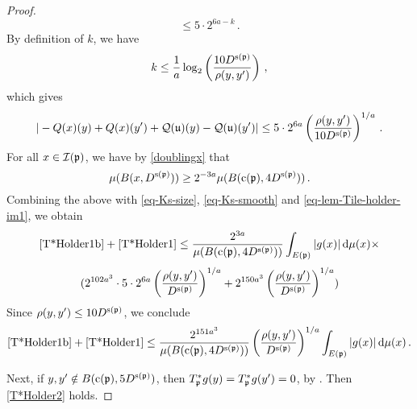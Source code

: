 \begin{proof}
        $$
            \le 5 \cdot 2^{6a - k}\,.
        $$
        By definition of $k$, we have
        $$
            k \le \frac{1}{a} \log_2\left(\frac{10 D^{{\mathrm{s}}({\mathfrak p})}}{\rho(y,y')}\right)\,,
        $$
        which gives
      \begin{equation}
            \label{eq-lem-Tile-holder-im1}
             |-{Q}(x)(y) + {Q}(x)(y') + {\mathcal{Q}}({\mathfrak u})(y) - {\mathcal{Q}}({\mathfrak u})(y')| \le 5 \cdot 2^{6a} \left(\frac{\rho(y,y')}{10 D^{{\mathrm{s}}({\mathfrak p})}}\right)^{1/a}\,.
        \end{equation}
        For all $x \in {\mathcal{I}}({\mathfrak p})$, we have by \eqref{doublingx} that
        $$
            \mu(B(x, D^{{\mathrm{s}}({\mathfrak p})})) \ge 2^{-3a} \mu(B({\mathrm{c}}({\mathfrak p}), 4D^{{\mathrm{s}}({\mathfrak p})}))\,.
        $$
        Combining the above with \eqref{eq-Ks-size}, \eqref{eq-Ks-smooth} and \eqref{eq-lem-Tile-holder-im1},
        we obtain
        $$
            \eqref{T*Holder1b}+\eqref{T*Holder1} \le \frac{2^{3a}}{\mu(B({\mathrm{c}}({\mathfrak p}), 4D^{{\mathrm{s}}({\mathfrak p})}))} \int_{E({\mathfrak p})}|g(x)| \, \mathrm{d}\mu(x) \times
        $$
        $$
            (2^{102a^3} \cdot 5 \cdot 2^{6a} \left(\frac{\rho(y,y')}{ D^{{\mathrm{s}}({\mathfrak p})}}\right)^{1/a} + 2^{150a^3} \left(\frac{\rho(y,y')}{D^{{\mathrm{s}}({\mathfrak p})}}\right)^{1/a})
        $$
        Since $\rho(y,y') \le 10 D^{{\mathrm{s}}({\mathfrak p})}$, we conclude
        $$
            \eqref{T*Holder1b}+\eqref{T*Holder1} \le \frac{2^{151a^3}}{\mu(B({\mathrm{c}}({\mathfrak p}), 4D^{{\mathrm{s}}({\mathfrak p})}))} \left(\frac{\rho(y,y')}{D^{{\mathrm{s}}({\mathfrak p})}}\right)^{1/a} \int_{E({\mathfrak p})}|g(x)| \, \mathrm{d}\mu(x)\,.
        $$

        Next, if $y,y' \notin B({\mathrm{c}}({\mathfrak p}), 5D^{{\mathrm{s}}({\mathfrak p})})$, then $T_{{\mathfrak p}}^*g(y) = T_{{\mathfrak p}}^*g(y') = 0$, by . Then \eqref{T*Holder2} holds.


\end{proof}
